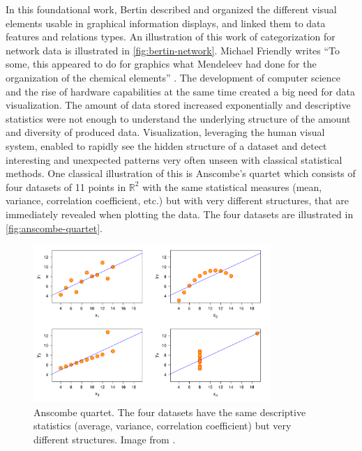 In this foundational work, Bertin described and organized the different visual elements usable in graphical information displays, and linked them to data features and relations types.
An illustration of this work of categorization for network data is illustrated in \autoref{fig:bertin-network}.
Michael Friendly writes ``To some, this appeared to do for graphics what Mendeleev had done for the organization of the chemical elements'' \cite{friendlyBriefHistoryData2008}.
The development of computer science and the rise of hardware capabilities at the same time created a big need for data visualization.
The amount of data stored increased exponentially \cite{hilbertWorldTechnologicalCapacity2011} and descriptive statistics were not enough to understand the underlying structure of the amount and diversity of produced data.
Visualization, leveraging the human visual system, enabled to rapidly see the hidden structure of a dataset and detect interesting and unexpected patterns very often unseen with classical statistical methods.
One classical illustration of this is Anscombe's quartet\cite{anscombeGraphsStatisticalAnalysis1973} which consists of four datasets of 11 points in $\mathbb{R} ^{2}$ with the same statistical measures (mean, variance, correlation coefficient, etc.) but with very different structures, that are immediately revealed when plotting the data.
The four datasets are illustrated in \autoref{fig:anscombe-quartet}.

\begin{figure}
    \centering %
    \includegraphics[width=0.8\textwidth]{static/figures/RelatedWork/Anscombe.pdf}
    \caption{Anscombe quartet. The four datasets have the same descriptive statistics (average, variance, correlation coefficient) but very different structures. Image from \cite{anscombeGraphsStatisticalAnalysis1973}.}
    \label{fig:anscombe-quartet}
\end{figure}

